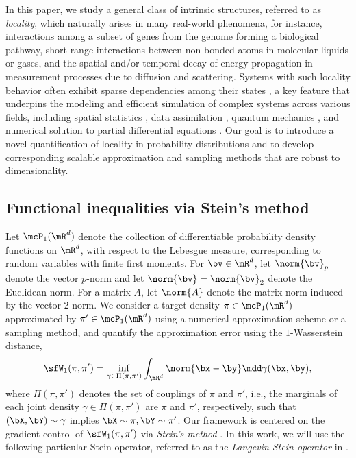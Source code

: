 \documentclass[11pt]{article}
\begin{document}
In this paper, we study a general class of intrinsic structures, referred to as \emph{locality}, which naturally arises in many real-world phenomena, for instance, interactions among a subset of genes from the genome forming a biological pathway, short-range interactions between non-bonded atoms in molecular liquids or gases, and the spatial and/or temporal decay of energy propagation in measurement processes due to diffusion and scattering.
%
Systems with such locality behavior often exhibit sparse dependencies among their states \cite{MR373208,MR3375889}, a key feature that underpins the modeling and efficient simulation of complex systems across various fields, including spatial statistics \cite{MR373208,MR964183,MR3538706}, data assimilation \cite{2001MWRv..129..123H,2001MWRv129.7690,MR3375889}, quantum mechanics \cite{PhysRevLett.76.3168,MR3032838}, and numerical solution to partial differential equations \cite{MR2054351}.
%
Our goal is to introduce a novel quantification of locality in probability distributions and to develop corresponding scalable approximation and sampling methods that are robust to dimensionality.




\subsection{Functional inequalities via Stein's method}
\label{sec:stein_intro}

Let $\mcP_1(\mR^d)$ denote the collection of differentiable probability density functions on $\mR^d$, with respect to the Lebesgue measure, corresponding to random variables with finite first moments. For $\bv\in\mR^d$, let $\norm{\bv}_p$ denote the vector $p$-norm and let $\norm{\bv} = \norm{\bv}_2$ denote the Euclidean norm. For a matrix $A$, let $\norm{A}$ denote the matrix norm induced by the vector $2$-norm.
%
We consider a target density $\pi \in \mcP_1(\mR^d)$ approximated by $\pi'\in \mcP_1(\mR^d)$ using a numerical approximation scheme or a sampling method, and quantify the approximation error using the $1$-Wasserstein distance,
\begin{equation}
    \sfW_1(\pi,\pi') = \inf_{\gamma\in \Pi(\pi,\pi')} \int_{\mR^d} \norm{\bx-\by} \mdd \gamma(\bx,\by),
\end{equation}
where $\Pi(\pi,\pi')$ denotes the set of couplings of $\pi$ and $\pi'$, i.e., the marginals of each joint density $\gamma \in \Pi(\pi,\pi')$ are $\pi$ and $\pi'$, respectively, such that $(\bX,\bY) \sim \gamma$ implies $\bX \sim \pi, \bY\sim \pi'$.
%
Our framework is centered on the gradient control of $\sfW_1(\pi,\pi')$ via \emph{Stein's method} \cite{MR402873,MR882007}.
In this work, we will use the following particular Stein operator, referred to as the \emph{Langevin Stein operator} in \cite{MR4019878}.
\end{document}
